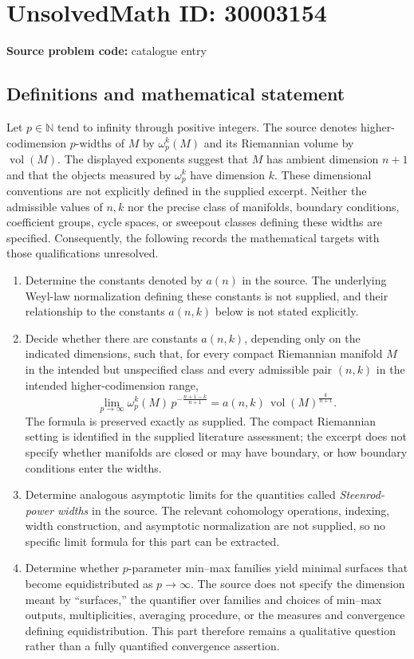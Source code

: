 \documentclass[11pt]{article}
\newcommand{\N}{\mathbb{N}}
\begin{document}
\section*{UnsolvedMath ID: 30003154}
\textbf{Source problem code:} catalogue entry
\subsection{Definitions and mathematical statement}
Let \(p\in\N\) tend to infinity through positive integers. The source denotes higher-codimension \(p\)-widths of \(M\) by \(\omega_p^k(M)\) and its Riemannian volume by \(\operatorname{vol}(M)\). The displayed exponents suggest that \(M\) has ambient dimension \(n+1\) and that the objects measured by \(\omega_p^k\) have dimension \(k\). These dimensional conventions are not explicitly defined in the supplied excerpt. Neither the admissible values of \(n,k\) nor the precise class of manifolds, boundary conditions, coefficient groups, cycle spaces, or sweepout classes defining these widths are specified. Consequently, the following records the mathematical targets with those qualifications unresolved.

\begin{enumerate}
\item Determine the constants denoted by \(a(n)\) in the source. The underlying Weyl-law normalization defining these constants is not supplied, and their relationship to the constants \(a(n,k)\) below is not stated explicitly.
\item Decide whether there are constants \(a(n,k)\), depending only on the indicated dimensions, such that, for every compact Riemannian manifold \(M\) in the intended but unspecified class and every admissible pair \((n,k)\) in the intended higher-codimension range,
\[
\lim_{p\to\infty}
\omega_p^k(M)\,p^{-\frac{n+1-k}{n+1}}
=
a(n,k)\,\operatorname{vol}(M)^{\frac{k}{n+1}}.
\]
The formula is preserved exactly as supplied. The compact Riemannian setting is identified in the supplied literature assessment; the excerpt does not specify whether manifolds are closed or may have boundary, or how boundary conditions enter the widths.
\item Determine analogous asymptotic limits for the quantities called \emph{Steenrod-power widths} in the source. The relevant cohomology operations, indexing, width construction, and asymptotic normalization are not supplied, so no specific limit formula for this part can be extracted.
\item Determine whether \(p\)-parameter min--max families yield minimal surfaces that become equidistributed as \(p\to\infty\). The source does not specify the dimension meant by ``surfaces,'' the quantifier over families and choices of min--max outputs, multiplicities, averaging procedure, or the measures and convergence defining equidistribution. This part therefore remains a qualitative question rather than a fully quantified convergence assertion.
\end{enumerate}
\end{document}
